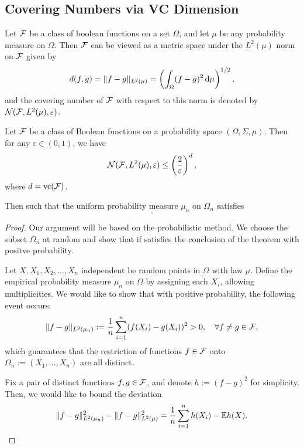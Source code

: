 \subsection{Covering Numbers via VC Dimension}

Let \({\mathcal F}\) be a class of boolean functions on a set \(\Omega\), and let \(\mu\) be any probability measure on \(\Omega\). Then \({\mathcal F}\) can be viewed as a metric space under the \(L^{2}(\mu)\) norm on \({\mathcal F}\) given by
\begin{equation*}
    d(f,g)=\|f-g\|_{L^{2}(\mu)}=\left(\int_{\Omega}(f-g)^{2}\mathop{}\!\mathrm{d}\mu\right)^{1/2},
\end{equation*}
 and the covering number of \({\mathcal F}\) with respect to this norm is denoted by \({\mathcal N}({\mathcal F},L^{2}(\mu),\varepsilon)\).

 \begin{theorem}
    \label{thm:covering-numbers-vc-dimension}
     Let \({\mathcal F}\) be a class of Boolean functions on a probability space \((\Omega,\Sigma,\mu)\). Then for any \(\varepsilon\in(0,1)\), we have
     \begin{equation*}
            {\mathcal N}({\mathcal F},L^{2}(\mu),\varepsilon)\leq\left(\frac{2}{\varepsilon}\right)^{d},
     \end{equation*}
    where \(d=\text{vc}({\mathcal F})\).
 \end{theorem}

 \begin{lemma}
    
    Then such that the uniform probability measure \(\mu_{n}\) on \(\Omega_{n}\) satisfies
    \begin{equation*}
        .
    \end{equation*}
 \end{lemma}

 \begin{proof}
    Our argument will be based on the probabilistic method. We choose the subset \(\Omega_{n}\) at random and show that if satisfies the conclusion of the theorem with positve probability.

    Let \(X,X_{1},X_{2},\ldots,X_{n}\) independent be random points in \(\Omega\) with law \(\mu\). Define the empirical probability measure \(\mu_{n}\) on \(\Omega\) by assigning each \(X_{i}\), allowing multiplicities. We would like to show that with positive probability, the following event occurs:
    \begin{equation*}
        \|f-g\|_{L^{2}(\mu_{n})}:=\frac{1}{n}\sum_{i=1}^{n}(f(X_{i})-g(X_{i}))^{2}>0,\quad\forall f\neq g\in{\mathcal F},
    \end{equation*}
    which guarantees that the restriction of functions \(f\in{\mathcal F}\) onto \(\Omega_{n}:=(X_{1},\ldots,X_{n})\) are all distinct.

    Fix a pair of distinct functions \(f,g\in{\mathcal F}\), and denote \(h:=(f-g)^{2}\) for simplicity. Then, we would like to bound the deviation
    \begin{equation*}
        \|f-g\|_{L^{2}(\mu_{n})}^{2}-\|f-g\|_{L^{2}(\mu)}^{2}=\frac{1}{n}\sum_{i=1}^{n}h(X_{i})-{\mathbb E} h(X).
    \end{equation*}

 \end{proof}

